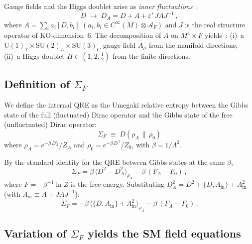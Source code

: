 \documentclass[prl,twocolumn,superscriptaddress,longbibliography]{revtex4-2}
\begin{document}
Gauge fields and the Higgs doublet arise as
\emph{inner fluctuations}~\cite{CC1996}:
\begin{equation}\label{eq:DA}
  D \;\to\; D_A
  = D + A + \varepsilon'\, J A J^{-1}\,,
\end{equation}
where $A = \sum_i a_i [D, b_i]$
$(a_i, b_i \in C^\infty(M) \otimes \mathcal{A}_F)$
and $J$ is the real structure operator of
KO-dimension~$6$.
The decomposition of $A$ on $M^4 \times F$
yields~\cite{vS2024}:
(i)~a $\mathrm{U}(1)_Y \times \mathrm{SU}(2)_L
\times \mathrm{SU}(3)_C$ gauge field
$A_\mu$ from the manifold directions;
(ii)~a Higgs doublet $H \in (1,2,\tfrac{1}{2})$
from the finite directions.


\subsection{Definition of $\Sigma_F$}
\label{sec:SigmaF}

We define the internal QRE as
the Umegaki relative entropy between the
Gibbs state of the full (fluctuated) Dirac
operator and the Gibbs state of the free
(unfluctuated) Dirac operator:
\begin{equation}\label{eq:SigmaF_def}
  \boxed{\;
  \Sigma_F
  \;\equiv\;
  D\!\left(\rho_A \,\big\|\, \rho_0\right)
  \;}
\end{equation}
where
$\rho_A = e^{-\beta\, D_A^2}/ Z_A$
and
$\rho_0 = e^{-\beta\, D^{\,2}}/ Z_0$,
with $\beta = 1/\Lambda^2$.

By the standard identity for the QRE between
Gibbs states at the same $\beta$,
\begin{equation}\label{eq:SigmaF_expand}
  \Sigma_F
  = \beta\,\bigl\langle
    D^2 - D_A^2
  \bigr\rangle_{\!\rho_A}
  - \beta\,(F_A - F_0)\,,
\end{equation}
where $F = -\beta^{-1}\ln Z$ is the
free energy.
Substituting
$D_A^2 = D^2 + \{D,A_{\mathrm{in}}\}
+ A_{\mathrm{in}}^2$
(with $A_{\mathrm{in}} \equiv A + JAJ^{-1}$):
\begin{equation}\label{eq:SigmaF_inner}
  \Sigma_F
  = -\beta\,\bigl\langle
    \{D,A_{\mathrm{in}}\}
    + A_{\mathrm{in}}^2
  \bigr\rangle_{\!\rho_A}
  - \beta\,(F_A - F_0)\,.
\end{equation}


\subsection{Variation of $\Sigma_F$ yields
the SM field equations}
\label{sec:variation}
\end{document}

